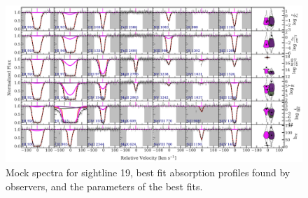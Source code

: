 \documentclass[fleqn,usenatbib]{mnras}
\begin{document}
\begin{figure}
    \centering
    \includegraphics[width=\textwidth]{figures/sample2/best_fits/0019.pdf}
    \caption{
    Mock spectra for sightline 19,
    best fit absorption profiles found by observers,
    and the parameters of the best fits.
    }
    \label{f: sample2 spectrum 19}
\end{figure}
\end{document}
